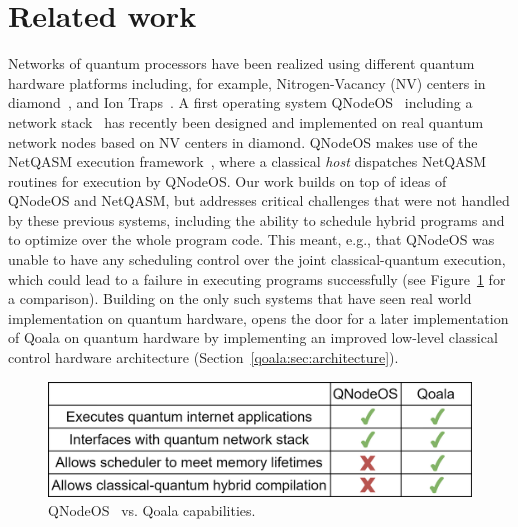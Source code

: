 \section{Related work}
\label{sec:related_work}

Networks of quantum processors have been realized using different quantum hardware platforms including, for example, Nitrogen-Vacancy (NV) centers in diamond~\cite{pompili2021realization}, and Ion Traps~\cite{krutyanskiy2023entanglement}.
A first operating system QNodeOS~\cite{carlothesis} including a network stack~\cite{pompili2022experimental} has recently been designed and implemented on real quantum network nodes based on NV centers in diamond.
QNodeOS makes use of the NetQASM execution framework~\cite{dahlberg2022netqasm}, where a classical \textit{host} dispatches NetQASM routines for execution by QNodeOS. 
Our work builds on top of ideas of QNodeOS and NetQASM, but addresses critical challenges that were not handled by these previous systems, including the ability to schedule hybrid programs and to optimize over the whole program code.
This meant, e.g., that QNodeOS was unable to have any scheduling control over the joint classical-quantum execution, which could lead to a failure in executing programs successfully (see Figure~\ref{fig:qoala_vs_qnos} for a comparison).
Building on the only such systems that have seen real world implementation on quantum hardware, opens the door for a later implementation of Qoala on quantum hardware by implementing an improved low-level classical control hardware architecture (Section~\ref{qoala:sec:architecture}).

\begin{figure}[ht]
    \centering
    \includegraphics[width=\columnwidth]{figures/qoala/qoala_vs_qnos.png}
    \caption{
        QNodeOS~\cite{carlothesis} vs. Qoala capabilities.
    }
    \label{fig:qoala_vs_qnos}
\end{figure}


